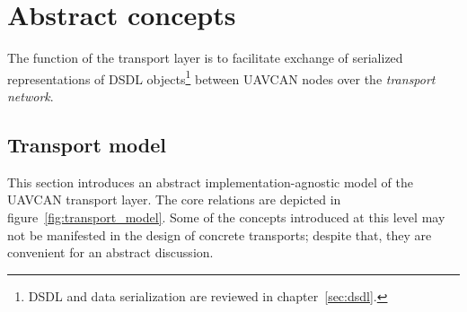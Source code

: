 \section{Abstract concepts}

The function of the transport layer is to facilitate exchange of serialized representations of DSDL objects\footnote{%
    DSDL and data serialization are reviewed in chapter~\ref{sec:dsdl}.
} between UAVCAN nodes over the \emph{transport network}.

\subsection{Transport model}\label{sec:transport_model}

This section introduces an abstract implementation-agnostic model of the UAVCAN transport layer.
The core relations are depicted in figure~\ref{fig:transport_model}.
Some of the concepts introduced at this level may not be manifested in the design of concrete transports;
despite that, they are convenient for an abstract discussion.

